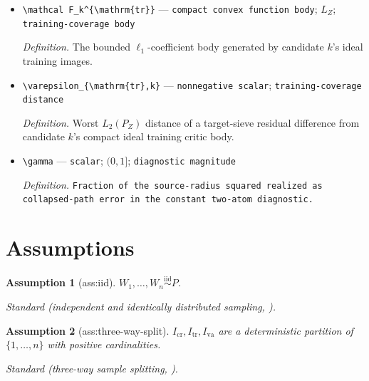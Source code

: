 \documentclass{article}
\newtheorem{assumption}{Assumption}
\begin{document}
\begin{itemize}
  \par\smallskip\noindent\emph{Definition.} \texttt{Second structural coefficient.}
  \item \texttt{\textbackslash{}\allowbreak{}mathcal F\_\allowbreak{}k\textasciicircum{}\{\textbackslash{}\allowbreak{}mathrm\{tr\}\allowbreak{}\}\allowbreak{}} --- \texttt{compact convex function body}; \(L_Z\); \texttt{training-\allowbreak{}coverage body}
  \par\smallskip\noindent\emph{Definition.} The bounded \(\ell_1\)-coefficient body generated by candidate \(k\)'s ideal training images.
  \item \texttt{\textbackslash{}\allowbreak{}varepsilon\_\allowbreak{}\{\textbackslash{}\allowbreak{}mathrm\{tr\}\allowbreak{},\allowbreak{}k\}\allowbreak{}} --- \texttt{nonnegative scalar}; \texttt{training-\allowbreak{}coverage distance}
  \par\smallskip\noindent\emph{Definition.} Worst \(L_2(P_Z)\) distance of a target-sieve residual difference from candidate \(k\)'s compact ideal training critic body.
  \item \texttt{\textbackslash{}\allowbreak{}gamma} --- \texttt{scalar}; \((0,1]\); \texttt{diagnostic magnitude}
  \par\smallskip\noindent\emph{Definition.} \texttt{Fraction of the source-\allowbreak{}radius squared realized as collapsed-\allowbreak{}path error in the constant two-\allowbreak{}atom diagnostic.}
\end{itemize}

\section{Assumptions}

\begin{assumption}[ass:iid]\label{ass:iid}
\(W_1,\ldots,W_n\stackrel{\mathrm{iid}}{\sim}P\).
\par\smallskip\noindent\emph{Standard} (independent and identically distributed sampling, \cite{TanSyrgkanis2026Adaptive}).
\end{assumption}

\begin{assumption}[ass:three-way-split]\label{ass:three-way-split}
\(I_{\mathrm{cr}},I_{\mathrm{tr}},I_{\mathrm{va}}\) are a deterministic partition of \(\{1,\ldots,n\}\) with positive cardinalities.
\par\smallskip\noindent\emph{Standard} (three-way sample splitting, \cite{LiLanSyrgkanisWangUehara2024RegularizedDeepIV}).
\end{assumption}
\end{document}
